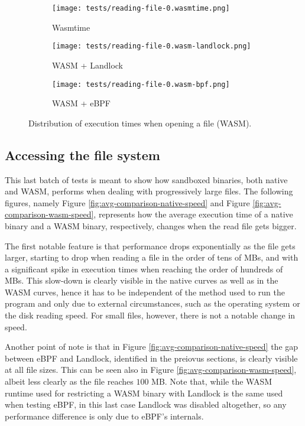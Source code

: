 \begin{figure}[ht]
  \centering
  \begin{subfigure}[b]{0.32\textwidth}
    \centering
    \texttt{[image: tests/reading-file-0.wasmtime.png]}
    \caption{Wasmtime}
  \end{subfigure}
  \begin{subfigure}[b]{0.32\textwidth}
    \centering
    \texttt{[image: tests/reading-file-0.wasm-landlock.png]}
    \caption{WASM + Landlock}
  \end{subfigure}
  \begin{subfigure}[b]{0.32\textwidth}
    \centering
    \texttt{[image: tests/reading-file-0.wasm-bpf.png]}
    \caption{WASM + eBPF}
  \end{subfigure}
  \caption{Distribution of execution times when opening a file (WASM).}
  \label{fig:distribution-opening-wasm}
\end{figure}

\subsection{Accessing the file system}

This last batch of tests is meant to show how sandboxed binaries, both native and WASM, performs when
dealing with progressively large files.
The following figures, namely Figure \ref{fig:avg-comparison-native-speed} and Figure \ref{fig:avg-comparison-wasm-speed},
represents how the average execution time of a native binary and a WASM binary, respectively, changes
when the read file gets bigger.

The first notable feature is that performance drops exponentially as the file gets larger,
starting to drop when reading a file in the order of tens of MBs, and with a significant
spike in execution times when reaching the order of hundreds of MBs.
This slow-down is clearly visible in the native curves as well as in the WASM curves,
hence it has to be independent of the method used to run the
program and only due to external circumstances, such as the operating system or the disk reading speed.
For small files, however, there is not a notable change in speed.

Another point of note is that in Figure \ref{fig:avg-comparison-native-speed} the gap between eBPF and Landlock,
identified in the preiovus sections, is clearly visible at all file sizes.
This can be seen also in Figure \ref{fig:avg-comparison-wasm-speed}, albeit less clearly as the file reaches $100$ MB.
Note that, while the WASM runtime used for restricting a WASM binary with Landlock is the same used when testing eBPF,
in this last case Landlock was disabled altogether, so any performance difference is only due to eBPF's internals.

